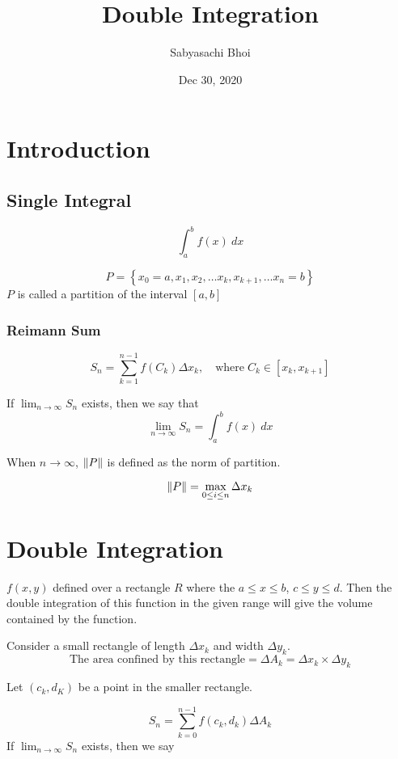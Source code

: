 \documentclass[12pt]{article}
\theoremstyle{definition}
\theoremstyle{definition}
\begin{document}
\title{Double Integration}
\author{Sabyasachi Bhoi}
\date{ Dec 30, 2020 }
\maketitle

\section{Introduction}

\subsection{Single Integral}

\[
	\int_{a }^{b} {f(x)} \: d{x} 
\]

\[
	P = \left\{ x_0 = a, x_1, x_2, \dots x_k, x_{k+1}, \dots x_n = b \right\}
\]
$P$ is called a partition of the interval $ \left[ a, b \right]$

\subsubsection{Reimann Sum}
\[
	S_n = \sum^{n-1}_{k = 1} f(C_k) \Delta x_k, \quad \textrm{where}\; C_k \in \left[ x_k, x_{k+1} \right] 
\]

If $ \lim_{n \to \infty} S_n $ exists, then we say that 
\[
	\lim_{n \to \infty} S_n = \int_{a}^{b} {f(x)} \: d{x} 
\]

When $n \to \infty$, $\norm{P}$ is defined as the norm of partition.

\[
	\norm{P} = \max_{0 \leq i \leq n} \Delta x_k
\]

\section{Double Integration}

$f(x, y)$ defined over a rectangle $R$ where the $ a \leq x \leq b$, $c \leq y \leq d$. Then the double integration of this function in the given range will give the volume contained by the function.

Consider a small rectangle of length $\Delta x_k$ and width $\Delta y_k$.
\[
	\textrm{The area confined by this rectangle} =  \Delta A_k = \Delta x_k \times \Delta y_k
\]

Let $\left( c_k, d_K \right)$ be a point in the smaller rectangle.

\[
	S_n = \sum^{n-1}_{k = 0} f(c_k, d_k) \Delta A_k
\]
If $ \lim_{n \to \infty} S_n$ exists, then we say 
\end{document}
